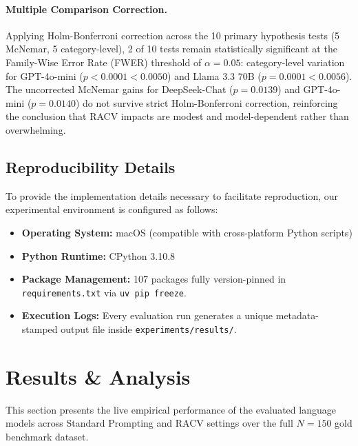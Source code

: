\documentclass[conference]{IEEEtran}
\begin{document}
\paragraph{Multiple Comparison Correction.} Applying Holm-Bonferroni correction across the 10 primary hypothesis tests (5 McNemar, 5 category-level), 2 of 10 tests remain statistically significant at the Family-Wise Error Rate (FWER) threshold of $\alpha = 0.05$: category-level variation for GPT-4o-mini ($p < 0.0001 < 0.0050$) and Llama 3.3 70B ($p = 0.0001 < 0.0056$). The uncorrected McNemar gains for DeepSeek-Chat ($p=0.0139$) and GPT-4o-mini ($p=0.0140$) do not survive strict Holm-Bonferroni correction, reinforcing the conclusion that RACV impacts are modest and model-dependent rather than overwhelming.

\subsection{Reproducibility Details}
To provide the implementation details necessary to facilitate reproduction, our experimental environment is configured as follows:
\begin{itemize}
\item \textbf{Operating System:} macOS (compatible with cross-platform Python scripts)
\item \textbf{Python Runtime:} CPython 3.10.8
\item \textbf{Package Management:} 107 packages fully version-pinned in \texttt{requirements.txt} via \texttt{uv pip freeze}.
\item \textbf{Execution Logs:} Every evaluation run generates a unique metadata-stamped output file inside \texttt{experiments/results/}.
\end{itemize}

\section{Results \& Analysis}
\label{sec:results}
This section presents the live empirical performance of the evaluated language models across Standard Prompting and RACV settings over the full $N=150$ gold benchmark dataset.
\end{document}
